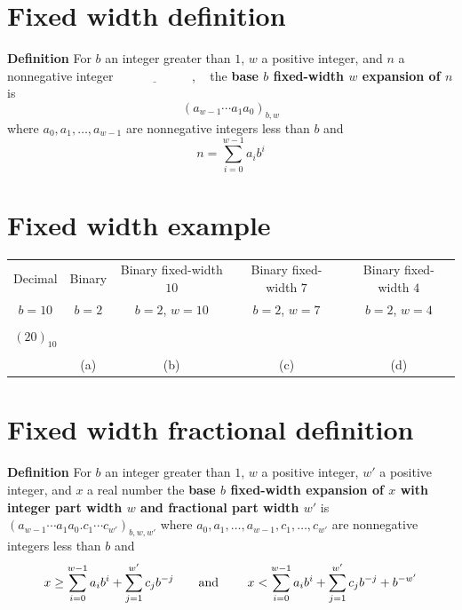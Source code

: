 \documentclass[12pt, oneside]{article}
\begin{document}
\section*{Fixed width definition}


{\bf Definition} For $b$ an integer greater than $1$, $w$ a positive integer, 
and $n$ a nonnegative integer
$\underline{\phantom{\hspace{1in}}}$, ~
the {\bf base $b$ fixed-width $w$ expansion of $n$}  is
\[
(a_{w-1} \cdots a_1 a_0)_{b,w}
\]
where  $a_0, a_1, \ldots, a_{w-1}$ are nonnegative integers less than $b$ and
\[
n =  \sum_{i=0}^{w-1} a_{i} b^{i}
\]
 \vfill
\section*{Fixed width example}


\begin{center}
    \begin{tabular}{|c|c|c|c|c|}
    \hline
    Decimal &  Binary  & Binary fixed-width $10$& Binary fixed-width $7$ & Binary fixed-width $4$\\
    $b=10$ & $b=2$ & $b=2$, $w =  10$& $b=2$, $w =  7$& $b=2$, $w =  4$ \\
    \hline 
    &&&&  \\
    $(20)_{10}$&\phantom{$(10100)_{2}$\qquad\qquad}&&  &\\
    &&&&  \\
    &(a)&(b)&(c)&(d)  \\
    \hline
    \end{tabular}
    \end{center}
 \vfill
\section*{Fixed width fractional definition}


{\bf Definition} For $b$ an integer greater than $1$, $w$ a positive integer, 
$w'$ a positive  integer, and $x$ a real number the {\bf base $b$ fixed-width 
expansion of $x$ with integer part width $w$  and fractional part width $w'$} is
$(a_{w-1} \cdots a_1 a_0 .  c_{1} \cdots c_{w'})_{b,w,w'}$
where  $a_0, a_1, \ldots, a_{w-1}, c_1, \ldots, c_{w'}$ are nonnegative integers less than $b$ and
$$x \geq \sum_{i=0}^{w-1} a_{i} b^{i} + \sum_{j=1}^{w'}  c_{j} b^{-j} \hfill
\textrm{\qquad and \qquad}
\hfill x < \sum_{i=0}^{w-1} a_{i} b^{i} + \sum_{j=1}^{w'} c_{j} b^{-j} + b^{-w'}$$
\end{document}
